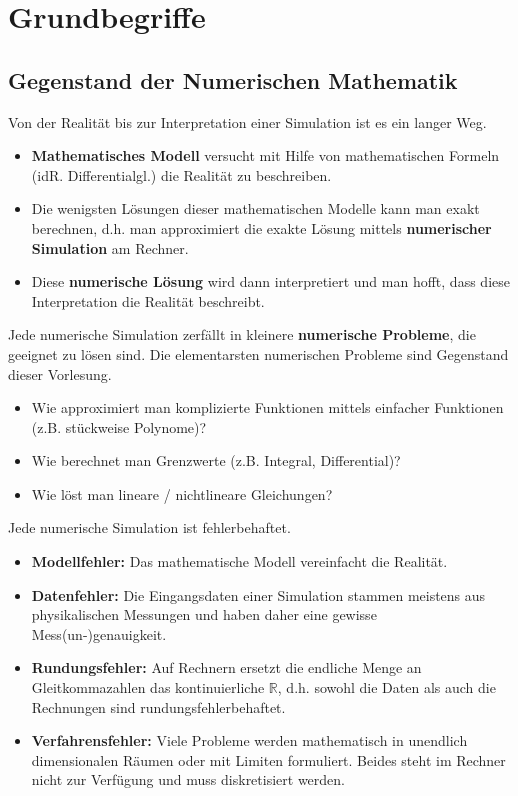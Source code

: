 \section{Grundbegriffe}
\subsection{Gegenstand der Numerischen Mathematik}

Von der Realität bis zur Interpretation einer Simulation ist es ein langer Weg.

\begin{itemize}
	\item \textbf{Mathematisches Modell} versucht mit Hilfe von mathematischen Formeln (idR. Differentialgl.) die Realität zu beschreiben.
	\item Die wenigsten Lösungen dieser mathematischen Modelle kann man exakt berechnen, d.h. man approximiert die exakte Lösung mittels \textbf{numerischer Simulation} am Rechner.
	\item Diese \textbf{numerische Lösung} wird dann interpretiert und man hofft, dass diese Interpretation die Realität beschreibt.
\end{itemize}

Jede numerische Simulation zerfällt in kleinere \textbf{numerische Probleme}, die geeignet zu lösen sind. Die elementarsten numerischen Probleme sind Gegenstand dieser Vorlesung.

\begin{example}
	\begin{itemize}
		\item Wie approximiert man komplizierte Funktionen mittels einfacher Funktionen (z.B. stückweise Polynome)?
		\item Wie berechnet man Grenzwerte (z.B. Integral, Differential)?
		\item Wie löst man lineare / nichtlineare Gleichungen?
	\end{itemize}
\end{example}

Jede numerische Simulation ist fehlerbehaftet.

\begin{itemize}
	\item \textbf{Modellfehler:} Das mathematische Modell vereinfacht die Realität.
	\item \textbf{Datenfehler:} Die Eingangsdaten einer Simulation stammen meistens aus physikalischen Messungen und haben daher eine gewisse Mess(un-)genauigkeit.
	\item \textbf{Rundungsfehler:} Auf Rechnern ersetzt die endliche Menge an Gleitkommazahlen das kontinuierliche $\mathbb{R}$, d.h. sowohl die Daten als auch die Rechnungen sind rundungsfehlerbehaftet.
	\item \textbf{Verfahrensfehler:} Viele Probleme werden mathematisch in unendlich dimensionalen Räumen oder mit Limiten formuliert. Beides steht im Rechner nicht zur Verfügung und muss diskretisiert werden.
\end{itemize}

